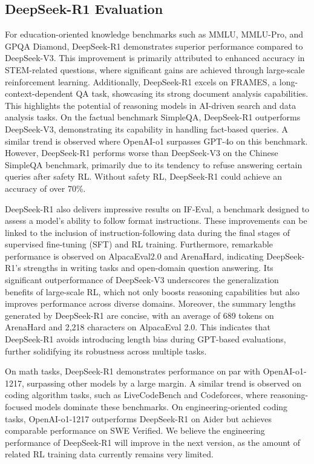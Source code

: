 \documentclass[11pt, a4paper, logo, copyright, nonumbering]{deepseek}
\newcommand{\dsri}{DeepSeek-R1}
\begin{document}
\subsection{\dsri{} Evaluation}


For education-oriented knowledge benchmarks such as MMLU, MMLU-Pro, and GPQA Diamond, \dsri{} demonstrates superior performance compared to DeepSeek-V3. This improvement is primarily attributed to enhanced accuracy in STEM-related questions, where significant gains are achieved through large-scale reinforcement learning. Additionally, \dsri{} excels on FRAMES, a long-context-dependent QA task, showcasing its strong document analysis capabilities. This highlights the potential of reasoning models in AI-driven search and data analysis tasks. On the factual benchmark SimpleQA, \dsri{} outperforms DeepSeek-V3, demonstrating its capability in handling fact-based queries. A similar trend is observed where OpenAI-o1 surpasses GPT-4o on this benchmark. However, \dsri{} performs worse than DeepSeek-V3 on the Chinese SimpleQA benchmark, primarily due to its tendency to refuse answering certain queries after safety RL. Without safety RL, \dsri{} could achieve an accuracy of over 70\%.


\dsri{} also delivers impressive results on IF-Eval, a benchmark designed to assess a model's ability to follow format instructions. These improvements can be linked to the inclusion of instruction-following data during the final stages of supervised fine-tuning (SFT) and RL training. Furthermore, remarkable performance is observed on AlpacaEval2.0 and ArenaHard, indicating \dsri{}’s strengths in writing tasks and open-domain question answering. Its significant outperformance of DeepSeek-V3 underscores the generalization benefits of large-scale RL, which not only boosts reasoning capabilities but also improves performance across diverse domains.
Moreover, the summary lengths generated by \dsri{} are concise, with an average of 689 tokens on ArenaHard and 2,218 characters on AlpacaEval 2.0. This indicates that \dsri{} avoids introducing length bias during GPT-based evaluations, further solidifying its robustness across multiple tasks.

On math tasks, \dsri{} demonstrates performance on par with OpenAI-o1-1217, surpassing other models by a large margin. A similar trend is observed on coding algorithm tasks, such as LiveCodeBench and Codeforces, where reasoning-focused models dominate these benchmarks. On engineering-oriented coding tasks, OpenAI-o1-1217 outperforms \dsri{} on Aider but achieves comparable performance on SWE Verified. We believe the engineering performance of \dsri{} will improve in the next version, as the amount of related RL training data currently remains very limited.
\end{document}
